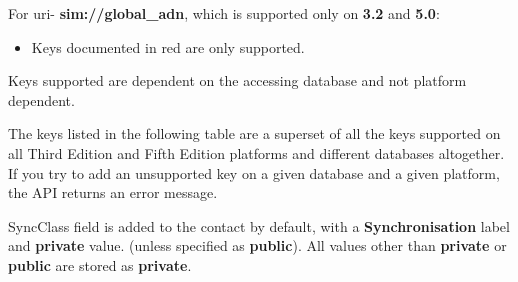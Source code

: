For uri- {\bf sim://global_adn}, which is supported only on {\bf 3.2} and {\bf 5.0}:

\begin{itemize}
\item  Keys documented in {\color{red}red} are only supported.
\end{itemize}

Keys supported are dependent on the accessing database and not platform dependent. \break

The keys listed in the following table are a superset of all the keys supported on all Third Edition and Fifth Edition platforms and different databases altogether. If you try to add an unsupported key on a given database and a given platform, the API returns an error message. \break

\begin{notice}[note]
SyncClass field is added to the contact by default, with a {\bf Synchronisation} label and {\bf private} value. (unless specified as {\bf public}). All values other than {\bf private} or {\bf public} are stored as {\bf private}.
\end{notice}
